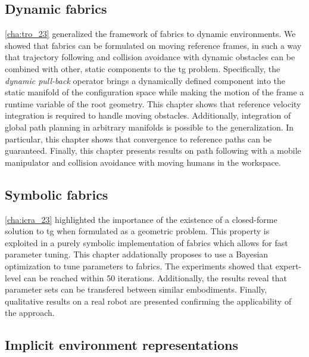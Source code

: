 \subsection{Dynamic fabrics}
\label{sec:conclusion_dynamic_fabrics}

\cref{cha:tro_23} generalized the framework of \ac{fabrics} to dynamic
environments. We showed that \ac{fabrics} can be formulated on moving reference
frames, in such a way that trajectory following and collision avoidance with
dynamic obstacles can be combined with other, static components to the \ac{tg}
problem. Specifically, the \textit{dynamic pull-back}
operator brings a dynamically defined component into the static manifold of the
configuration space while making the motion of the frame a runtime variable of
the root geometry. This chapter shows that reference velocity integration is
required to handle moving obstacles. Additionally, integration of global path
planning in arbitrary manifolds is possible to the generalization. In
particular, this chapter shows that convergence to reference paths can be 
guaranteed. Finally, this chapter presents results on path following with a
mobile manipulator and collision avoidance with moving humans in the workspace.


\subsection{Symbolic fabrics}
\label{sec:conclusion_symbolic_fabrics}

\cref{cha:icra_23} highlighted the importance of the existence of a
closed-forme solution to \ac{tg} when formulated as a geometric problem.
This property is exploited in a purely symbolic implementation of \ac{fabrics}
which allows for fast parameter tuning. This chapter addationally
proposes to use a Bayesian optimization to tune parameters to \ac{fabrics}.
The experiments showed that expert-level can be reached within 50 iterations.
Additionally, the results reveal that parameter sets can be transfered between
similar embodiments. Finally, qualitative results on a real robot are presented
confirming the applicability of the approach.

\subsection{Implicit environment representations}
\label{sec:conclusion_implicit}


